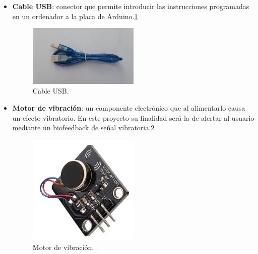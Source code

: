 \begin{itemize}
\item \textbf{Cable USB}: conector que permite introducir las instrucciones programadas en un ordenador a la placa de Arduino.\ref{fig:cableUSB}
\begin{figure}[h!]
    \centering
    \includegraphics[width=0.5\textwidth]{img/imgCableUSB.jpg}
    \caption{Cable USB.}
    \label{fig:cableUSB} %
\end{figure}

\item \textbf{Motor de vibración}: un componente electrónico que al alimentarlo causa un efecto vibratorio. En este proyecto su finalidad será la de alertar al usuario mediante un biofeedback de señal vibratoria.\ref{fig:motorVibr}
\begin{figure}[h!]
    \centering
    \includegraphics[width=0.5\textwidth]{img/MotorVibr.jpg}
    \caption{Motor de vibración.}
    \label{fig:motorVibr} %
\end{figure}


\end{itemize}
